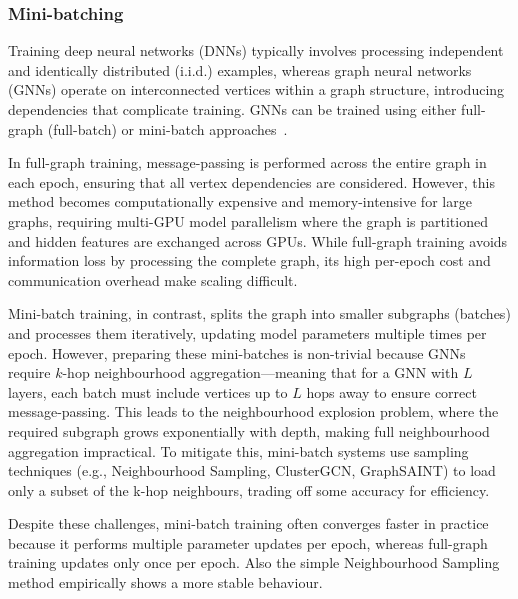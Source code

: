 \subsubsection{Mini-batching}

Training deep neural networks (DNNs) typically involves processing independent and identically distributed (i.i.d.) examples, whereas graph neural networks (GNNs) operate on interconnected vertices within a graph structure, introducing dependencies that complicate training. GNNs can be trained using either full-graph (full-batch) or mini-batch approaches~\cite{bajaj2024graph}.

In full-graph training, message-passing is performed across the entire graph in each epoch, ensuring that all vertex dependencies are considered. However, this method becomes computationally expensive and memory-intensive for large graphs, requiring multi-GPU model parallelism where the graph is partitioned and hidden features are exchanged across GPUs. While full-graph training avoids information loss by processing the complete graph, its high per-epoch cost and communication overhead make scaling difficult.

Mini-batch training, in contrast, splits the graph into smaller subgraphs (batches) and processes them iteratively, updating model parameters multiple times per epoch. However, preparing these mini-batches is non-trivial because GNNs require $k$-hop neighbourhood aggregation—meaning that for a GNN with $L$ layers, each batch must include vertices up to $L$ hops away to ensure correct message-passing. This leads to the neighbourhood explosion problem, where the required subgraph grows exponentially with depth, making full neighbourhood aggregation impractical. To mitigate this, mini-batch systems use sampling techniques (e.g., Neighbourhood Sampling, ClusterGCN, GraphSAINT) to load only a subset of the k-hop neighbours, trading off some accuracy for efficiency. 

Despite these challenges, mini-batch training often converges faster in practice because it performs multiple parameter updates per epoch, whereas full-graph training updates only once per epoch. Also the simple Neighbourhood Sampling method empirically shows a more stable behaviour.

